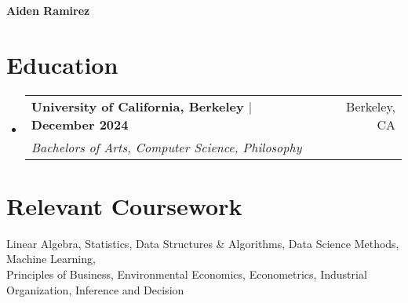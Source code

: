 \documentclass[a4paper,12pt]{article}
\makeatletter
\newcommand{\resumeSubheading}[4]{
  \item[]
    \begin{tabular*}{\textwidth}{l@{\extracolsep{\fill}}r}
      \textbf{#1} & #2 \\
      \textit{#3} & \textit{#4} \\
    \end{tabular*}
}
\newcommand{\resumeSubHeadingListStart}{\begin{itemize}[leftmargin=0in]}
\newcommand{\resumeSubHeadingListEnd}{\end{itemize}}
\makeatother
\begin{document}
\begin{center}
  \textbf{{\huge Aiden Ramirez}}\\
\end{center}

\noindent{}

\vspace{0.1cm}

\section{Education}
\resumeSubHeadingListStart
\vspace{0.2cm}
    \resumeSubheading
    {University of California, Berkeley \textnormal{$\vert$ December 2024}}{Berkeley, CA}
    {Bachelors of Arts, Computer Science, Philosophy}{}
\resumeSubHeadingListEnd

\section{Relevant Coursework}
\vspace{0.2cm}
Linear Algebra, Statistics, Data Structures \& Algorithms, Data Science Methods, Machine Learning,\\
Principles of Business, Environmental Economics, Econometrics, Industrial Organization, Inference and Decision

\vspace{0.15cm}
\end{document}
